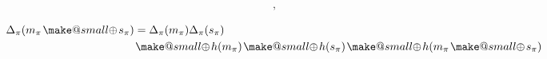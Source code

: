 \documentclass[twocolumn, aps, amsmath, amssymb, nofootinbib, superscriptaddress, longbibliography, doublefloatfix, table-of-contents, eqsecnum, rmp]{revtex4-2}
\makeatletter
\newcommand{\soplus}{{{\hspace{1pt}}{\mathbin{\mathpalette\make@small\oplus}}}{\hspace{1pt}}}
\newcommand{\make@small}[2]{%
  \vcenter{\hbox{%
    \scalebox{0.6}{$\m@th#1#2$}%
  }}%
}
\makeatother
\begin{document}

\begin{align}
	[m_\pi \soplus s_\pi, \Delta_\pi(m_\pi\soplus s_\pi)],
\end{align}

\begin{align}
	\Delta_\pi(m_\pi\soplus s_\pi) &= \Delta_\pi(m_\pi) \Delta_\pi(s_\pi) \nonumber\\
	&\soplus h(m_\pi) \soplus h(s_\pi) \soplus h(m_\pi \soplus s_\pi)
\end{align}

\end{document}
